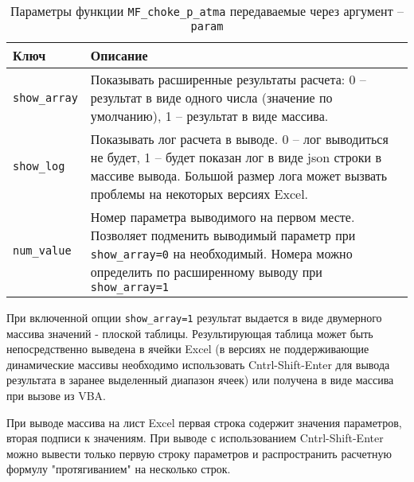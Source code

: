 \begin{table}[H]
	\caption{Параметры функции \texttt{MF_choke_p_atma} передаваемые через аргумент -- \texttt{param}}
	\label{table:param_list_2}
	\begin{tabular}{p{}p{}}
		\hline
		Ключ & Описание  \\ \hline
		\texttt{show_array} & Показывать расширенные результаты расчета: 0 -- результат в виде одного числа (значение по умолчанию), 1 -- результат в виде массива.    \\ \hline
		
		\texttt{show_log} & Показывать лог расчета в выводе. 0 -- лог выводиться не будет, 1 -- будет показан лог в виде json строки в массиве вывода. Большой размер лога может вызвать проблемы на некоторых версиях Excel.   \\ \hline
		
		\texttt{num_value} & Номер параметра выводимого на первом месте. Позволяет подменить выводимый параметр при \texttt{show_array=0} на необходимый. Номера можно определить по расширенному выводу при \texttt{show_array=1}  \\ \hline
		
	\end{tabular}
\end{table}

При включенной опции \texttt{show_array=1} результат выдается в виде двумерного массива значений - плоской таблицы. Результирующая таблица может быть непосредственно выведена в ячейки Excel (в версиях не поддерживающие динамические массивы необходимо использовать Cntrl-Shift-Enter для вывода результата в заранее выделенный диапазон ячеек) или получена в виде массива при вызове из VBA.

При выводе массива на лист Excel первая строка содержит значения параметров, вторая подписи к значениям. При выводе с использованием Cntrl-Shift-Enter можно вывести только первую строку параметров и распространить расчетную формулу "протягиванием" на несколько строк.

